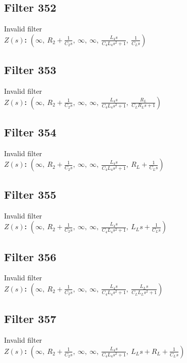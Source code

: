 \documentclass{article}
\begin{document}
\subsection*{Filter 352}
Invalid filter \\ 
\textbf{$Z(s)$:} $\left( \infty, \  R_{2} + \frac{1}{C_{2} s}, \  \infty, \  \infty, \  \frac{L_{4} s}{C_{4} L_{4} s^{2} + 1}, \  \frac{1}{C_{L} s}\right)$ \\ 
\subsection*{Filter 353}
Invalid filter \\ 
\textbf{$Z(s)$:} $\left( \infty, \  R_{2} + \frac{1}{C_{2} s}, \  \infty, \  \infty, \  \frac{L_{4} s}{C_{4} L_{4} s^{2} + 1}, \  \frac{R_{L}}{C_{L} R_{L} s + 1}\right)$ \\ 
\subsection*{Filter 354}
Invalid filter \\ 
\textbf{$Z(s)$:} $\left( \infty, \  R_{2} + \frac{1}{C_{2} s}, \  \infty, \  \infty, \  \frac{L_{4} s}{C_{4} L_{4} s^{2} + 1}, \  R_{L} + \frac{1}{C_{L} s}\right)$ \\ 
\subsection*{Filter 355}
Invalid filter \\ 
\textbf{$Z(s)$:} $\left( \infty, \  R_{2} + \frac{1}{C_{2} s}, \  \infty, \  \infty, \  \frac{L_{4} s}{C_{4} L_{4} s^{2} + 1}, \  L_{L} s + \frac{1}{C_{L} s}\right)$ \\ 
\subsection*{Filter 356}
Invalid filter \\ 
\textbf{$Z(s)$:} $\left( \infty, \  R_{2} + \frac{1}{C_{2} s}, \  \infty, \  \infty, \  \frac{L_{4} s}{C_{4} L_{4} s^{2} + 1}, \  \frac{L_{L} s}{C_{L} L_{L} s^{2} + 1}\right)$ \\ 
\subsection*{Filter 357}
Invalid filter \\ 
\textbf{$Z(s)$:} $\left( \infty, \  R_{2} + \frac{1}{C_{2} s}, \  \infty, \  \infty, \  \frac{L_{4} s}{C_{4} L_{4} s^{2} + 1}, \  L_{L} s + R_{L} + \frac{1}{C_{L} s}\right)$ \\ 
\end{document}
